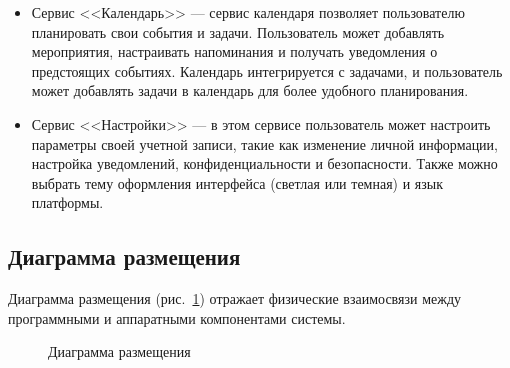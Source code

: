 \begin{itemize}
    \item Сервис <<Календарь>> — сервис календаря позволяет пользователю планировать свои события и задачи. Пользователь может добавлять мероприятия, настраивать напоминания и получать уведомления о предстоящих событиях. Календарь интегрируется с задачами, и пользователь может добавлять задачи в календарь для более удобного планирования.

    \item Сервис <<Настройки>> — в этом сервисе пользователь может настроить параметры своей учетной записи, такие как изменение личной информации, настройка уведомлений, конфиденциальности и безопасности. Также можно выбрать тему оформления интерфейса (светлая или темная) и язык платформы.
\end{itemize}

\subsection{Диаграмма размещения}

Диаграмма размещения (рис.~\ref{place:image}) отражает физические взаимосвязи между программными и аппаратными компонентами системы.

\vspace{-8mm} %
\begin{figure}[ht]
\caption{Диаграмма размещения}
\label{place:image}
\end{figure}

